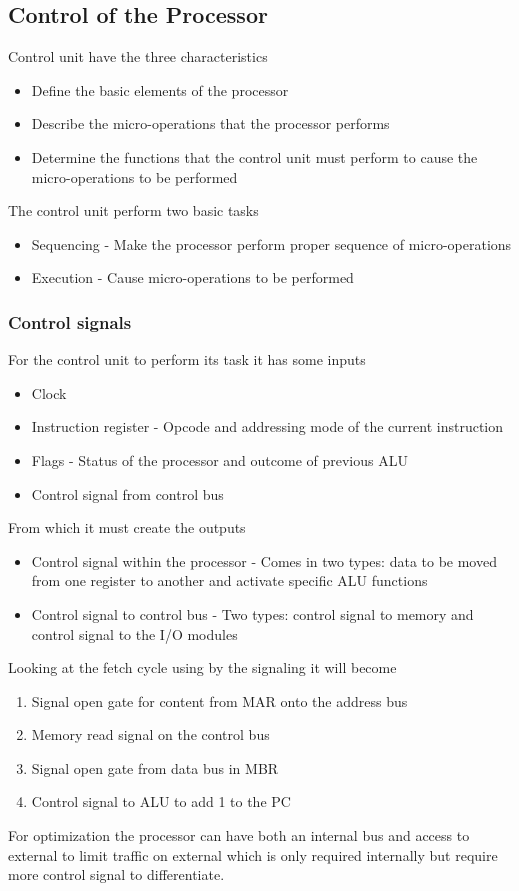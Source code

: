 \documentclass[12pt, a4paper]{article}
\begin{document}
		\subsection{Control of the Processor}
			Control unit have the three characteristics\\
			\begin{itemize}
				\item Define the basic elements of the processor
				\item Describe the micro-operations that the processor performs
				\item Determine the functions that the control unit must perform to cause the micro-operations to be performed
			\end{itemize}
			The control unit perform two basic tasks
			\begin{itemize}
				\item Sequencing - Make the processor perform proper sequence of micro-operations
				\item Execution - Cause micro-operations to be performed
			\end{itemize}
			\subsubsection{Control signals}
				For the control unit to perform its task it has some inputs
				\begin{itemize}
					\item Clock
					\item Instruction register - Opcode and addressing mode of the current instruction
					\item Flags - Status of the processor and outcome of previous ALU
					\item Control signal from control bus
				\end{itemize}
				From which it must create the outputs
				\begin{itemize}
					\item Control signal within the processor - Comes in two types: data to be moved from one register to another and activate specific ALU functions
					\item Control signal to control bus - Two types: control signal to memory and control signal to the I/O modules
				\end{itemize}
				Looking at the fetch cycle using by the signaling it will become
				\begin{enumerate}
					\item Signal open gate for content from MAR onto the address bus
					\item Memory read signal on the control bus
					\item Signal open gate from data bus in MBR
					\item Control signal to ALU to add 1 to the PC
				\end{enumerate}
				For optimization the processor can have both an internal bus and access to external to limit traffic on external which is only required internally but require more control signal to differentiate.
\end{document}
